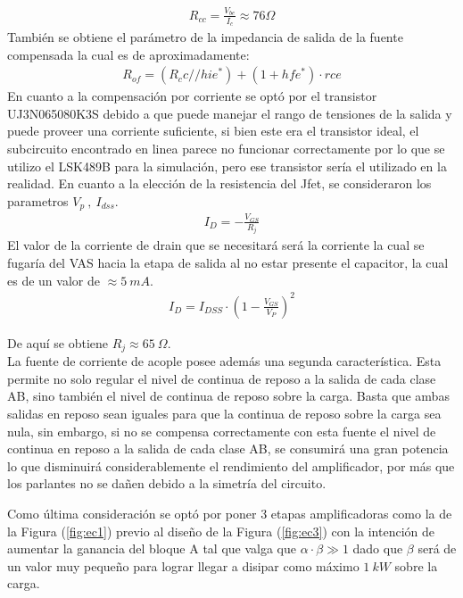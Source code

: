\begin{align}
R_{cc}=\frac{V_{be}}{I_c}\approx 76\Omega
\end{align}
También se obtiene el parámetro de la impedancia de salida de la fuente compensada la cual es de aproximadamente:
\begin{align}
R_{of} = (R_cc // hie^*)+(1+hfe^* )\cdot rce
\end{align}
En cuanto a la compensación por corriente se optó por el transistor UJ3N065080K3S debido a que puede manejar el rango de tensiones de la salida y puede proveer una corriente suficiente, si bien este era el transistor ideal, el subcircuito encontrado en linea parece no funcionar correctamente por lo que se utilizo el LSK489B para la simulación, pero ese transistor sería el utilizado en la realidad. En cuanto a la  elección de la resistencia del Jfet, se consideraron los parametros $V_p \ , \ I_{dss}$.
\begin{align}
I_D=-\frac{V_{GS}}{R_j}
\end{align}
El valor de la corriente de drain que se necesitará será la corriente la cual se fugaría del VAS hacia la etapa de salida al no estar presente el capacitor, la cual es de un valor de $\approx 5 \ mA$.
\begin{align}
I_D= I_{DSS} \cdot \left(1-\frac{V_{GS}}{V_P} \right)^2
\end{align}

De aquí se obtiene $R_j \approx 65 \ \Omega$.\\
La fuente de corriente de acople posee además una segunda característica. Esta permite no solo regular el nivel de continua de reposo a la salida de cada clase AB, sino también el nivel de continua de reposo sobre la carga. Basta que ambas salidas en reposo sean iguales para que la continua de reposo sobre la carga sea nula, sin embargo, si no se compensa correctamente con esta fuente el nivel de continua en reposo a la salida de cada clase AB, se consumirá una gran potencia lo que disminuirá considerablemente el rendimiento del amplificador, por más que los parlantes no se dañen debido a la simetría del circuito.

Como última consideración se optó por poner 3 etapas amplificadoras como la de la Figura (\ref{fig:ec1}) previo al diseño de la Figura (\ref{fig:ec3}) con la intención de aumentar la ganancia del bloque A tal  que valga que $\alpha \cdot \beta \gg 1$ dado que $\beta$ será de un valor muy pequeño para lograr llegar a disipar como máximo $1 \ kW$ sobre la carga.


